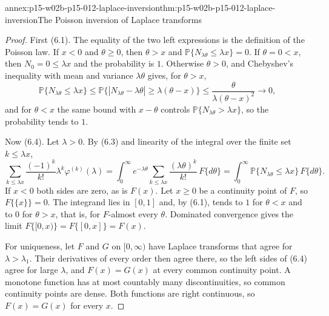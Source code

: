 \begin{annexitem}{annex:p15-w02b-p15-012-laplace-inversion}{thm:p15-w02b-p15-012-laplace-inversion}{The Poisson inversion of Laplace transforms}
\begin{proof}
First (6.1). The equality of the two left expressions is the definition of
the Poisson law. If \(x<0\) and \(\theta\geq0\), then \(\theta>x\) and
\(\mathbb P\{N_{\lambda\theta}\leq\lambda x\}=0\). If \(\theta=0<x\), then
\(N_0=0\leq\lambda x\) and the probability is \(1\). Otherwise
\(\theta>0\), and Chebyshev's inequality with mean and variance
\(\lambda\theta\) gives, for \(\theta>x\),
\[
 \mathbb P\{N_{\lambda\theta}\leq\lambda x\}
   \leq\mathbb P\{|N_{\lambda\theta}-\lambda\theta|\geq\lambda(\theta-x)\}
   \leq\frac{\theta}{\lambda(\theta-x)^2}\longrightarrow0,
\]
and for \(\theta<x\) the same bound with \(x-\theta\) controls
\(\mathbb P\{N_{\lambda\theta}>\lambda x\}\), so the probability tends to
\(1\).

Now (6.4). Let \(\lambda>0\). By (6.3) and linearity of the integral over the
finite set \(k\leq\lambda x\),
\[
 \sum_{k\leq\lambda x}\frac{(-1)^k}{k!}\lambda^k\varphi^{(k)}(\lambda)
   =\int_0^\infty e^{-\lambda\theta}\sum_{k\leq\lambda x}\frac{(\lambda\theta)^k}{k!}\,F\{d\theta\}
   =\int_0^\infty\mathbb P\{N_{\lambda\theta}\leq\lambda x\}\,F\{d\theta\}.
\]
If \(x<0\) both sides are zero, as is \(F(x)\). Let \(x\geq0\) be a continuity
point of \(F\), so \(F\{\{x\}\}=0\). The integrand lies in \([0,1]\) and, by
(6.1), tends to \(1\) for \(\theta<x\) and to \(0\) for \(\theta>x\), that
is, for \(F\)-almost every \(\theta\). Dominated convergence gives the limit
\(F\{[0,x)\}=F\{[0,x]\}=F(x)\).

For uniqueness, let \(F\) and \(G\) on \([0,\infty)\) have Laplace transforms
that agree for \(\lambda>\lambda_1\). Their derivatives of every order then
agree there, so the left sides of (6.4) agree for large \(\lambda\), and
\(F(x)=G(x)\) at every common continuity point. A monotone function has at
most countably many discontinuities, so common continuity points are dense.
Both functions are right continuous, so \(F(x)=G(x)\) for every \(x\).
\end{proof}
\end{annexitem}

